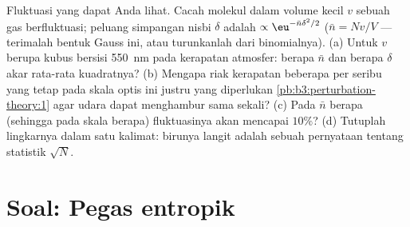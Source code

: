 \begin{exercise}[$\star\star\star$]\label{exo:b3:microcanonical-ensemble:12}
Fluktuasi yang dapat Anda lihat. Cacah molekul dalam volume kecil $v$
sebuah gas berfluktuasi; peluang simpangan nisbi $\delta$ adalah
$\propto\eu^{-\bar n\delta^2/2}$ ($\bar n = Nv/V$ --- terimalah bentuk
Gauss ini, atau turunkanlah dari binomialnya). (a) Untuk $v$ berupa
kubus bersisi \qty{550}{nm} pada kerapatan atmosfer: berapa $\bar n$ dan
berapa $\delta$ akar rata-rata kuadratnya? (b) Mengapa riak kerapatan
beberapa per seribu yang tetap pada skala optis ini justru yang
diperlukan \cref{pb:b3:perturbation-theory:1} agar udara dapat menghambur
sama sekali? (c) Pada $\bar n$ berapa (sehingga pada skala berapa)
fluktuasinya akan mencapai $10\%$? (d) Tutuplah lingkarnya dalam satu
kalimat: birunya langit adalah sebuah pernyataan tentang statistik
$\sqrt N$.
\end{exercise}

\section{Soal: Pegas entropik}

